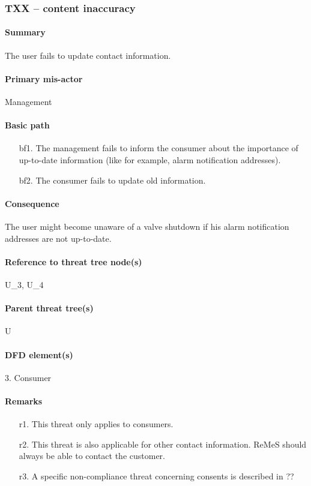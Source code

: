 \subsubsection{TXX -- content inaccuracy} %

\paragraph{Summary} The user fails to update contact information. 

\paragraph{Primary mis-actor} Management

\paragraph{Basic path}
\begin{enumerate}
	\item[bf1.] The management fails to inform the consumer about the importance of
	up-to-date information (like for example, alarm notification addresses).
    \item[bf2.] The consumer fails to update old information.
\end{enumerate}

\paragraph{Consequence} The user might become unaware of a valve shutdown if his
alarm notification addresses are not up-to-date.

\paragraph{Reference to threat tree node(s)} U_3, U_4

\paragraph{Parent threat tree(s)} U

\paragraph{DFD element(s)} 3. Consumer

\paragraph{Remarks}
\begin{enumerate}
     \item[r1.] This threat only applies to consumers.
     \item[r2.] This threat is also applicable for other contact information.
     ReMeS should always be able to contact the customer.
     \item[r3.] A specific non-compliance threat concerning consents is
     described in ?? %
\end{enumerate}
